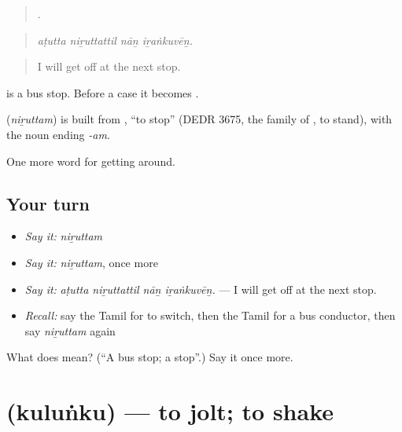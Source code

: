 \begin{quote}
   .
\end{quote}

\begin{quote}
\emph{aṭutta niṟuttattil nāṉ iṟaṅkuvēṉ.}
\end{quote}

\begin{quote}
I will get off at the next stop.
\end{quote}

  is a bus stop. Before a case it becomes .

\begin{cousinweb}
\textbf{} (\emph{niṟuttam}) is built from , \textquotedblleft{}to stop\textquotedblright{} (DEDR 3675, the family of , to stand), with the noun ending \emph{-am}.
\end{cousinweb}

\begin{grammarlens}[title={What you've built}]
One more word for getting around.
\end{grammarlens}

\subsection*{Your turn}
\begin{itemize}
\raggedright
  \item \emph{Say it:} \emph{niṟuttam}
  \item \emph{Say it:} \emph{niṟuttam}, once more
  \item \emph{Say it:} \emph{aṭutta niṟuttattil nāṉ iṟaṅkuvēṉ.} — I will get off at the next stop.
  \item \emph{Recall:} say the Tamil for to switch, then the Tamil for a bus conductor, then say \emph{niṟuttam} again
\end{itemize}

\begin{tcolorbox}[breakable,colback=teal!4,colframe=teal!35!black,title={Before you move on}]
What does  mean? (\textquotedblleft{}A bus stop; a stop\textquotedblright{}.) Say it once more.
\end{tcolorbox}
\section[\texorpdfstring{\ta{குலுங்கு} (kuluṅku)}{குலுங்கு (kuluṅku)}]{ (kuluṅku) — to jolt; to shake}

